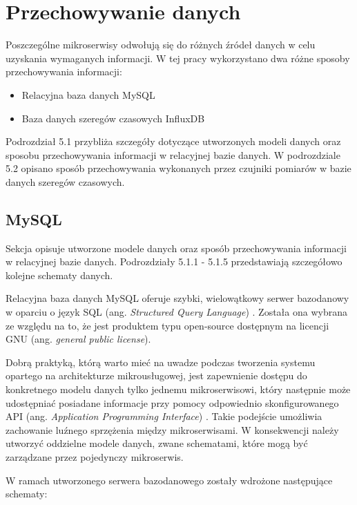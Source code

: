 \newpage
\section{Przechowywanie danych}

Poszczególne mikroserwisy odwołują się do różnych źródeł danych w celu uzyskania 
wymaganych informacji. W tej pracy wykorzystano dwa różne sposoby przechowywania 
informacji:

\begin{itemize} %
    \item Relacyjna baza danych MySQL
    \item Baza danych szeregów czasowych InfluxDB
\end{itemize}

Podrozdział 5.1 przybliża szczegóły dotyczące utworzonych modeli danych oraz sposobu 
przechowywania informacji w relacyjnej bazie danych. W podrozdziale 5.2 opisano sposób przechowywania
wykonanych przez czujniki pomiarów w bazie danych szeregów czasowych.

\subsection{MySQL}
Sekcja opisuje utworzone modele danych oraz sposób przechowywania informacji
w relacyjnej bazie danych. Podrozdziały 5.1.1 - 5.1.5 przedstawiają
szczegółowo kolejne schematy danych.

Relacyjna baza danych MySQL oferuje szybki, wielowątkowy serwer bazodanowy w oparciu 
o język SQL (ang. \textit{Structured Query Language})
\cite{mysql2022}. Została ona wybrana ze względu na to, że 
jest produktem typu open-source dostępnym na licencji GNU (ang. \textit{general public license}). 

Dobrą praktyką, którą warto mieć na uwadze podczas tworzenia systemu opartego na 
architekturze mikrousługowej, jest zapewnienie dostępu do konkretnego modelu danych tylko 
jednemu mikroserwisowi, który następnie może udostępniać posiadane informacje przy pomocy odpowiednio 
skonfigurowanego API (ang. \textit{Application Programming Interface}) \cite{richardson2021}. Takie podejście umożliwia zachowanie luźnego 
sprzężenia między mikroserwisami. W konsekwencji należy utworzyć oddzielne modele 
danych, zwane schematami, które mogą być zarządzane przez pojedynczy mikroserwis.

W ramach utworzonego serwera bazodanowego zostały wdrożone następujące schematy:


